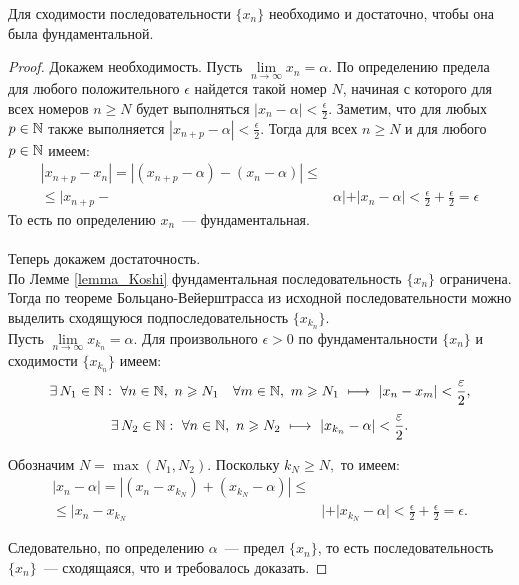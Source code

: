 \begin{theorem}
Для сходимости последовательности \(\{x_{n}\}\) необходимо и достаточно,
чтобы она была фундаментальной.

\begin{proof}
Докажем необходимость.
Пусть \(\lim\limits_{n \to \infty} {x_{n}} = \alpha.\) По определению предела
для любого положительного \(\epsilon\) найдется такой номер \(N\), начиная с которого
 для всех номеров \(n \geq N\) будет выполняться \(|x_{n}-\alpha|<\frac{\epsilon}{2}.\)
Заметим, что для любых \(p \in \mathbb{N}\) также выполняется \(|x_{n+p} - \alpha| < \frac{\epsilon}{2}\).
Тогда для всех \(n \geq N\) и для любого \(p \in \mathbb{N}\) имеем:
\[
\begin{aligned}
|x_{n+p} - x_{n}| = |(x_{n+p} - \alpha) - (x_{n} - \alpha)| \leq \\
\leq |x_{n+p} - & \alpha| + |x_{n} - \alpha| < \frac{\epsilon}{2} + \frac{\epsilon}{2} = \epsilon
\end{aligned}
\]
То есть по определению \(x_{n}\)~--- фундаментальная. \\
\\

Теперь докажем достаточность.\\
По Лемме \ref{lemma_Koshi} фундаментальная последовательность \(\{x_{n}\}\) ограничена.
Тогда по теореме Больцано-Вейерштрасса из исходной последовательности
можно выделить сходящуюся подпоследовательность \(\{x_{k_{n}}\}\). \\

Пусть \(\lim\limits_{n \to \infty} {x_{k_{n}}} = \alpha.\)
Для произвольного \(\epsilon > 0\) по фундаментальности \(\{x_{n}\}\)
и сходимости \(\{x_{k_{n}}\}\) имеем:
\[
\exists \, N_{1} \in \mathbb{N} : ~ \forall n \in \mathbb{N}, ~ n \geqslant N_{1} \hspace{1em}
\forall m \in \mathbb{N}, ~ m \geqslant N_{1} ~ \longmapsto ~ |x_{n} - x_{m}| < \frac{\varepsilon}{2},
\]
\[
\exists \, N_{2} \in \mathbb{N} : ~ \forall n \in \mathbb{N}, ~ n \geqslant N_{2}
~ \longmapsto ~ |x_{k_{n}} - \alpha| < \frac{\varepsilon}{2}.
\]

Обозначим \(N = \max(N_{1}, N_{2}).\) Поскольку \(k_{N} \geq N,\) то имеем:
\[
\begin{aligned}
|x_{n} - \alpha| = |(x_{n} - x_{k_{N}}) + (x_{k_{N}} - \alpha)| \leq \\
\leq |x_{n} - x_{k_{N}}&| + |x_{k_{N}} - \alpha| <
\frac{\epsilon}{2} + \frac{\epsilon}{2} = \epsilon.
\end{aligned}
\]

Следовательно, по определению \(\alpha\)~--- предел \(\{x_{n}\}\),
то есть последовательность \(\{x_{n}\}\)~--- сходящаяся, что и требовалось доказать.
\end{proof}
\end{theorem}
